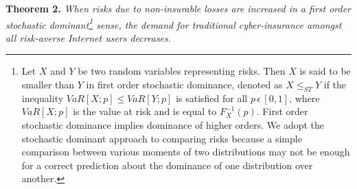 \documentclass[letterpaper,12pt, onecolumn, nodraft]{IEEEtran}
\begin{document}
\textbf{Theorem 2. }\emph{When risks due to non-insurable losses are increased in a first order stochastic dominant\footnote{Let $X$ and $Y$ be two random variables representing risks. Then $X$ is said to be smaller than $Y$ in first order stochastic dominance, denoted as $X \le_{ST} Y$ if the inequality $VaR[X;p] \le VaR[Y; p]$ is satisfied for all $p\,\epsilon\,[0,1]$, where $VaR[X;p]$ is the value at risk and is equal to $F_{X}^{-1}(p)$. First order stochastic dominance implies dominance of higher orders. We adopt the stochastic dominant approach to comparing risks because a simple comparison between various moments of two distributions may not be enough for a correct prediction about the dominance of one distribution over another.} sense, the demand for traditional cyber-insurance amongst all risk-averse Internet users decreases.} \\
\end{document}
